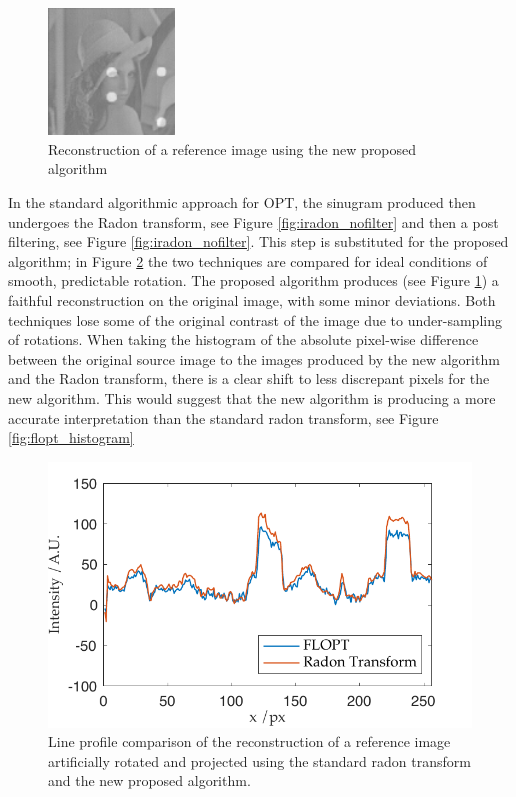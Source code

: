 \begin{figure}
  \centering
  \includegraphics[width=0.3\textwidth]{Chapters/flopt/Figs/PDF/results/no_helix/flopt_filter}
\caption{Reconstruction of a reference image using the new proposed algorithm}
\label{fig:flopt_filter}
\end{figure}

In the standard algorithmic approach for OPT, the sinugram produced then undergoes the Radon transform, see Figure \ref{fig:iradon_nofilter} and then a post filtering, see Figure \ref{fig:iradon_nofilter}.
This step is substituted for the proposed algorithm; in Figure \ref{fig:flopt_comparison_line_profile} the two techniques are compared for ideal conditions of smooth, predictable rotation.
The proposed algorithm produces (see Figure \ref{fig:flopt_filter}) a faithful reconstruction on the original image, with some minor deviations.
Both techniques lose some of the original contrast of the image due to under-sampling of rotations.
When taking the histogram of the absolute pixel-wise difference between the original source image to the images produced by the new algorithm and the Radon transform, there is a clear shift to less discrepant pixels for the new algorithm.
This would suggest that the new algorithm is producing a more accurate interpretation than the standard radon transform, see Figure \ref{fig:flopt_histogram}

\begin{figure}
  \centering
  \includegraphics{Chapters/flopt/Figs/PDF/results/comparison_line_profile}
  \caption{Line profile comparison of the reconstruction of a reference image artificially rotated and projected using the standard radon transform and the new proposed algorithm.}
  \label{fig:flopt_comparison_line_profile}
\end{figure}

